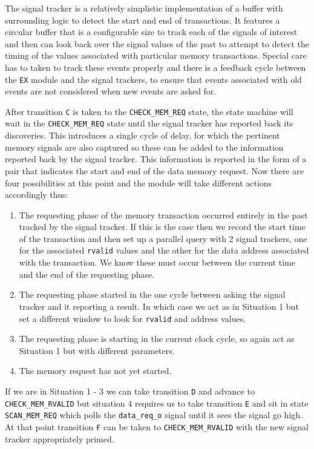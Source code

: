 The signal tracker is a relatively simplistic implementation of a buffer with surrounding logic to detect the start and end of transactions. It features a circular buffer that is a configurable size to track each of the signals of interest and then can look back over the signal values of the past to attempt to detect the timing of the values associated with particular memory transactions. Special care has to taken to track these events properly and there is a feedback cycle between the \texttt{EX} module and the signal trackers, to ensure that events associated with old events are not considered when new events are asked for.

After transition \texttt{C} is taken to the \texttt{CHECK\_MEM\_REQ} state, the state machine will wait in the \texttt{CHECK\_MEM\_REQ} state until the signal tracker has reported back its discoveries. This introduces a single cycle of delay, for which the pertinent memory signals are also captured so these can be added to the information reported back by the signal tracker. This information is reported in the form of a pair that indicates the start and end of the data memory request. Now there are four possibilities at this point and the module will take different actions accordingly thus:

\begin{enumerate}
	\item The requesting phase of the memory transaction occurred entirely in the past tracked by the signal tracker. If this is the case then we record the start time of the transaction and then set up a parallel query with 2 signal trackers, one for the associated \texttt{rvalid} values and the other for the data address associated with the transaction. We know these must occur between the current time and the end of the requesting phase.
	\item The requesting phase started in the one cycle between asking the signal tracker and it reporting a result. In which case we act as in Situation 1 but set a different window to look for \texttt{rvalid} and address values.
	\item The requesting phase is starting in the current clock cycle, so again act as Situation 1 but with different parameters.
	\item The memory request has not yet started.
\end{enumerate}

If we are in Situation 1 - 3 we can take transition \texttt{D} and advance to \texttt{CHECK\_MEM\_RVALID} but situation 4 requires us to take transition \texttt{E} and sit in state \texttt{SCAN\_MEM\_REQ} which polls the \texttt{data\_req\_o} signal until it sees the signal go high. At that point transition \texttt{F} can be taken to \texttt{CHECK\_MEM\_RVALID} with the new signal tracker appropriately primed. 

